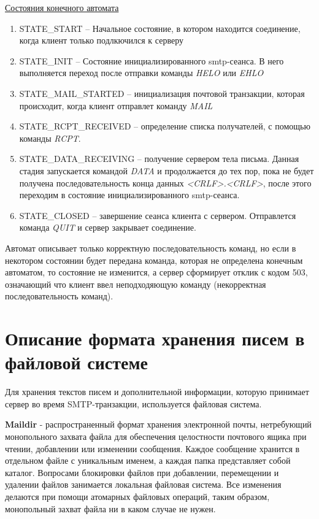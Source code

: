 \documentclass[a4paper,12pt]{report}
\begin{document}
    \underline{Состояния конечного автомата }
    \begin{enumerate}
        \item STATE\_START -- Начальное состояние, в котором находится соединение, когда клиент только подлкючился к серверу
        \item STATE\_INIT -- Состояние инициализированного smtp-сеанса.
		 В него выполняется переход после отправки команды \textit{HELO} или \textit{EHLO}
        \item STATE\_MAIL\_STARTED -- инициализация почтовой транзакции, которая происходит, когда клиент отправлет команду \textit{MAIL}
        \item STATE\_RCPT\_RECEIVED -- определение списка получателей, с помощью команды \textit{RCPT}. 
        \item STATE\_DATA\_RECEIVING -- получение сервером тела письма.
		 Данная стадия запускается командой \textit{DATA} и продолжается до тех пор, пока не будет получена последовательность конца данных \textit{<CRLF>.<CRLF>}, 
		 после этого переходим в состояние инициализированного smtp-сеанса.		  
        \item STATE\_CLOSED -- завершение сеанса клиента с сервером. Отправлется команда \textit{QUIT} и сервер закрывает соединение.
    \end{enumerate}

	   
    Автомат описывает только корректную последовательность команд,
	 но если в некотором состоянии будет передана команда, 
	 которая не определена конечным автоматом, то состояние не изменится, а сервер сформирует отклик с кодом 503, 
	 означающий что клиент ввел неподходяющую команду (некорректная последовательность команд).
	
	\section{Описание формата хранения писем в файловой системе}
    	
	Для хранения текстов писем и дополнительной информации, которую принимает сервер во время SMTP-транзакции,
	 используется файловая система.
	
	\textbf{Maildir} - распространенный формат хранения электронной почты, 
	нетребующий монопольного захвата файла для обеспечения целостности почтового ящика при чтении, 
	добавлении или изменении сообщения. Каждое сообщение хранится в отдельном файле с уникальным именем, 
	а каждая папка представляет собой каталог. Вопросами блокировки файлов при добавлении, 
	перемещении и удалении файлов занимается локальная файловая система. 
	Все изменения делаются при помощи атомарных файловых операций, таким образом, монопольный захват файла 
	ни в каком случае не нужен.
\end{document}
